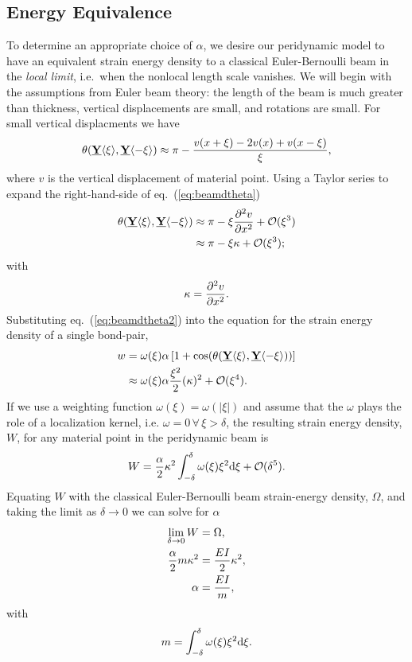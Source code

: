 \documentclass[5p,twocolumn]{elsarticle}
\newcommand\vstate[3]{%
	\mathbf{\underline{#1}}%
	\ifstrempty{#2}{}{[#2]}%
	\ifstrempty{#3}{}{\langle #3 \rangle}}
\begin{document}
\subsection{Energy Equivalence}
\label{sec:EnergyEq}
%
To determine an appropriate choice of $\alpha$, we desire our peridynamic model to have an equivalent strain energy density to a classical Euler-Bernoulli beam in the \emph{local limit}, i.e.\ when the nonlocal length scale vanishes.  We will begin with the assumptions from Euler beam theory: the length of the beam is much greater than thickness, vertical displacements are small, and rotations are small. For small vertical displacments we have
%
\begin{equation}
\theta(\vstate{Y}{}{\xi},\vstate{Y}{}{\mathbf{-\xi}}) \approx \pi-\frac{v(x+\xi)-2v(x)+v(x-\xi)}{\xi},
\label{eq:beamdtheta}
\end{equation}
%
where $v$ is the vertical displacement of material point.  Using a Taylor series to expand the right-hand-side of eq.~(\ref{eq:beamdtheta})  
%
\begin{align}
\theta(\vstate{Y}{}{\xi},\vstate{Y}{}{\mathbf{-\xi}}) &\approx \pi-\xi \frac{\partial^2 v}{\partial x^2}+\mathcal{O}(\xi^3) \notag \\
&\approx  \pi-\xi \kappa +\mathcal{O}(\xi^3); 
\label{eq:beamdtheta2}
\end{align}
with
\begin{equation}
\kappa = \frac{\partial^2 v}{\partial x^2}.\notag
\end{equation}
%
Substituting eq.~(\ref{eq:beamdtheta2}) into the equation for the strain energy density of a single bond-pair,
%
\begin{align}
\label{eq:continuousBeamw}
w &= \omega(\xi) \alpha \left[1+\cos(\theta(\vstate{Y}{}{\xi},\vstate{Y}{}{\mathbf{-\xi}})) \right] \notag\\
&\approx \omega(\xi) \alpha\frac{\xi^2}{2}(\kappa)^2 +\mathcal{O}(\xi^4).\notag
\end{align}
%
If we use a weighting function \(\omega(\xi)=\omega(|\xi|)\) and assume that the $\omega$ plays the role of a localization kernel, i.e. $\omega = 0 \, \forall \, \xi > \delta$, the resulting strain energy density, $W$, for any material point in the peridynamic beam is
%
\begin{equation}
W = \frac{\alpha}{2}\kappa^2 \int_{-\delta}^\delta \omega(\xi)\xi^2 {\rm d}\xi + \mathcal{O}(\delta^5).\notag
\end{equation}
%
Equating $W$ with the classical Euler-Bernoulli beam strain-energy density, $\Omega$, and taking the limit as $\delta \to 0$ we can solve for $\alpha$
%
\begin{align}
    \lim_{\delta \to 0}  W &= \Omega, \notag \\
    \frac{\alpha}{2} m \kappa^2 &= \frac{EI}{2} \kappa^2, \notag \\
    \alpha &= \frac{EI}{m},
\label{eq:alpha}
\end{align}
%
with 
\begin{equation}
    m = \int_{-\delta}^{\delta} \omega(\xi) \xi^2 {\rm d}\xi \notag.
\end{equation}
\end{document}
